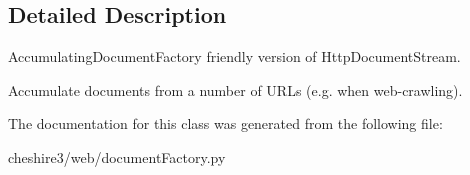 \subsection{Detailed Description}
\begin{DoxyVerb}AccumulatingDocumentFactory friendly version of HttpDocumentStream.

Accumulate documents from a number of URLs (e.g. when web-crawling).\end{DoxyVerb}
 

The documentation for this class was generated from the following file\-:\begin{DoxyCompactItemize}
\item 
cheshire3/web/document\-Factory.\-py\end{DoxyCompactItemize}

